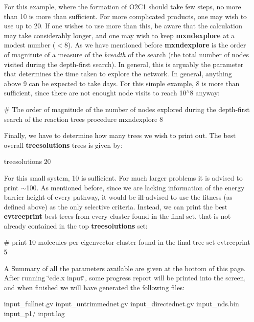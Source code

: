 For this example, where the formation of O2\+C1 should take few steps, no more than 10 is more than sufficient. For more complicated products, one may wish to use up to 20. If one wishes to use more than this, be aware that the calculation may take considerably longer, and one may wish to keep {\bfseries mxndexplore} at a modest number ($<$8). As we have mentioned before {\bfseries mxndexplore} is the order of magnitute of a measure of the {\itshape breadth} of the search (the total number of nodes visited during the depth-\/first search). In general, this is arguably the parameter that determines the time taken to explore the network. In general, anything above 9 can be expected to take days. For this simple example, 8 is more than sufficient, since there are not enought node visits to reach 10$^\wedge$8 anyway\+: \begin{DoxyVerb}# The order of magnitude of the number of nodes explored during the depth-first search of the reaction trees procedure
mxndexplore 8
\end{DoxyVerb}


Finally, we have to determine how many trees we wish to print out. The best overall {\bfseries treesolutions} trees is given by\+: \begin{DoxyVerb}treesolutions 20
\end{DoxyVerb}


For this small system, 10 is sufficient. For much larger problems it is advised to print $\sim$100. As mentioned before, since we are lacking information of the energy barrier height of every pathway, it would be ill-\/advised to use the fitness (as defined above) as the only selective criteria. Instead, we can print the best {\bfseries evtreeprint} best trees from every cluster found in the final set, that is not already contained in the top {\bfseries treesolutions} set\+: \begin{DoxyVerb}#  print 10 molecules per eigenvector cluster found in the final tree set
evtreeprint 5
\end{DoxyVerb}


A Summary of all the parameters available are given at the bottom of this page. After running \char`\"{}cde.\+x input\char`\"{}, some progress report will be printed into the screen, and when finished we will have generated the following files\+: \begin{DoxyVerb}input_fullnet.gv
input_untrimmednet.gv
input_directednet.gv
input_nds.bin
input_p1/
input.log
\end{DoxyVerb}


